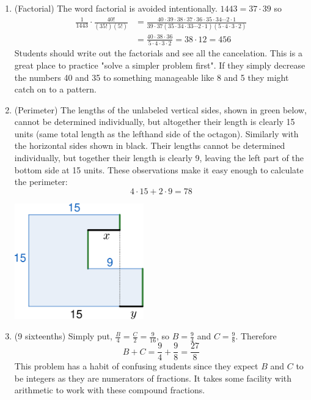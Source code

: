 {\begin{enumerate}
		\item (Factorial) The word factorial is avoided intentionally. $1443=37\cdot 39$ so
		\begin{align*}
			\frac{1}{1443}\cdot\frac{40!}{\left(35!\right)\left(5!\right)} & =\frac{40\cdot39\cdot38\cdot37\cdot36\cdot35\cdot34\cdots2\cdot1}{39\cdot37\left(35\cdot34\cdot33\cdots2\cdot1\right)\left(5\cdot4\cdot3\cdot2\right)}\\
			& =\frac{40\cdot38\cdot36}{5\cdot4\cdot3\cdot2}=38\cdot12=456
		\end{align*}
		Students should write out the factorials and see all the cancelation. This is a great place to practice "solve a simpler problem first". If they simply decrease the numbers 40 and 35 to something manageable like 8 and 5 they might catch on to a pattern.
		
		\item (Perimeter) The lengths of the unlabeled vertical sides, shown in green below, cannot be determined individually, but altogether their length is clearly 15 units (same total length as the lefthand side of the octagon). Similarly with the horizontal sides shown in black. Their lengths cannot be determined individually, but together their length is clearly 9, leaving the left part of the bottom side at 15 units. These observations make it easy enough to calculate the perimeter:
		$$4\cdot15+2\cdot9=78$$
		\begin{center}
			\includegraphics[height=5cm]{images/FinalProject-fig02-solution.pdf}\par
		\end{center}
		
		\item (9 sixteenths) Simply put, ${\displaystyle\frac{B}{4}=\frac{C}{2}=\frac{9}{16}}$, so ${\displaystyle B=\frac94}$ and ${\displaystyle C=\frac98}$. Therefore
		$$B+C=\frac94+\frac98=\frac{27}{8}$$
		This problem has a habit of confusing students since they expect $B$ and $C$ to be integers as they are numerators of fractions. It takes some facility with arithmetic to work with these compound fractions.
	

\end{enumerate}}
